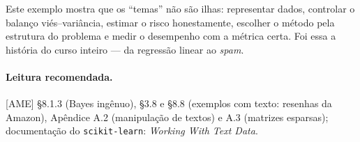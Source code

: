 \documentclass[11pt,a4paper]{article}
\begin{document}
\begin{ideia}
Este exemplo mostra que os ``temas'' não são ilhas: representar dados, controlar o
balanço viés--variância, estimar o risco honestamente, escolher o método pela
estrutura do problema e medir o desempenho com a métrica certa. Foi essa a história
do curso inteiro --- da regressão linear ao \emph{spam}.
\end{ideia}

\paragraph{Leitura recomendada.} [AME] §8.1.3 (Bayes ingênuo), §3.8 e §8.8 (exemplos
com texto: resenhas da Amazon), Apêndice A.2 (manipulação de textos) e A.3 (matrizes
esparsas); documentação do \texttt{scikit-learn}: \emph{Working With Text Data}.
\end{document}
